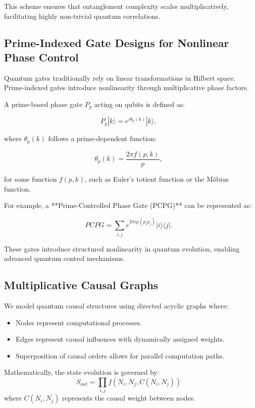\documentclass{article}
\theoremstyle{plain}
\begin{document}
This scheme ensures that entanglement complexity scales multiplicatively, facilitating highly non-trivial quantum correlations.

\subsection{Prime-Indexed Gate Designs for Nonlinear Phase Control}

Quantum gates traditionally rely on linear transformations in Hilbert space. Prime-indexed gates introduce nonlinearity through multiplicative phase factors.

A prime-based phase gate \( P_p \) acting on qubits is defined as:

\begin{equation}
P_p |k\rangle = e^{i \theta_p(k)} |k\rangle,
\end{equation}

where \( \theta_p(k) \) follows a prime-dependent function:

\begin{equation}
\theta_p(k) = \frac{2\pi f(p,k)}{p},
\end{equation}

for some function \( f(p,k) \), such as Euler's totient function or the Möbius function.

For example, a **Prime-Controlled Phase Gate (PCPG)** can be represented as:

\begin{equation}
PCPG = \sum_{i,j} e^{2\pi i \mu(p_i p_j)} |i\rangle \langle j|.
\end{equation}

These gates introduce structured nonlinearity in quantum evolution, enabling advanced quantum control mechanisms.

\subsection{Multiplicative Causal Graphs}
We model quantum causal structures using directed acyclic graphs where:
\begin{itemize}
    \item Nodes represent computational processes.
    \item Edges represent causal influences with dynamically assigned weights.
    \item Superposition of causal orders allows for parallel computation paths.
\end{itemize}
Mathematically, the state evolution is governed by:
\begin{equation}
S_{out} = \prod_{i,j} f(N_i, N_j, C(N_i, N_j))
\end{equation}
where $C(N_i, N_j)$ represents the causal weight between nodes.
\end{document}
